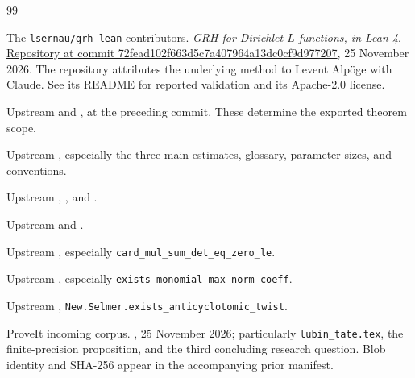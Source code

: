 \begingroup
\setlength{\parskip}{0pt}
\begin{thebibliography}{99}\small\raggedright
\setlength{\itemsep}{3pt}
\setlength{\parsep}{0pt}
 The \texttt{lsernau/grh-lean} contributors.
\emph{GRH for Dirichlet $L$-functions, in Lean 4}.
\href{https://github.com/lsernau/grh-lean/tree/72fead102f663d5c7a407964a13dc0cf9d977207}{Repository at commit 72fead102f663d5c7a407964a13dc0cf9d977207}, 25 November 2026. The repository attributes the underlying method to Levent Alp\"oge with Claude. See its README for reported validation and its Apache-2.0 license.

 Upstream  and , at the preceding commit. These determine the exported theorem scope.

 Upstream , especially the three main estimates, glossary, parameter sizes, and conventions.

 Upstream , , and .

 Upstream  and .

 Upstream , especially \texttt{card\_mul\_sum\_det\_eq\_zero\_le}.

 Upstream , especially \texttt{exists\_monomial\_max\_norm\_coeff}.

 Upstream , \texttt{New.Selmer.exists\_anticyclotomic\_twist}.

 ProveIt incoming corpus.
, 25 November 2026; particularly \texttt{lubin\_tate.tex}, the finite-precision proposition, and the third concluding research question. Blob identity and SHA-256 appear in the accompanying prior manifest.


\end{thebibliography}
